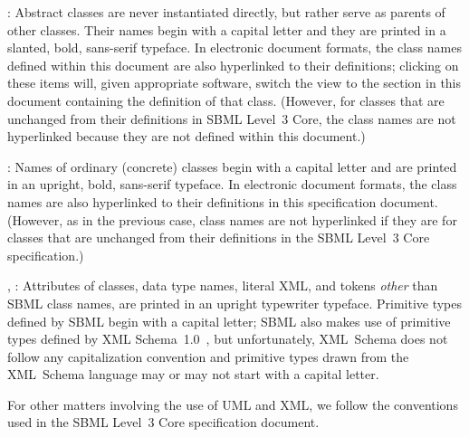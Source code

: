 \begin{description}
  
\item {}: Abstract classes are never
  instantiated directly, but rather serve as parents of other classes.
  Their names begin with a capital letter and they are printed in a
  slanted, bold, sans-serif typeface.  In electronic document formats,
  the class names defined within this document are also hyperlinked to
  their definitions; clicking on these items will, given appropriate
  software, switch the view to the section in this document containing
  the definition of that class.  (However, for classes that are
  unchanged from their definitions in SBML Level~3 Core, the class names
  are not hyperlinked because they are not defined within this
  document.)
  
\item {}: Names of ordinary (concrete) classes begin with a
  capital letter and are printed in an upright, bold, sans-serif
  typeface.  In electronic document formats, the class names are also
  hyperlinked to their definitions in this specification document.
  (However, as in the previous case, class names are not hyperlinked if
  they are for classes that are unchanged from their definitions in the
  SBML Level~3 Core specification.)

\item {}, : Attributes of classes, data
  type names, literal XML, and tokens \emph{other} than SBML class
  names, are printed in an upright typewriter typeface.  Primitive types
  defined by SBML begin with a capital letter; SBML also makes use of
  primitive types defined by XML
  Schema~1.0~\citep{biron:2000,fallside:2000,thompson:2000}, but
  unfortunately, XML~Schema does not follow any capitalization
  convention and primitive types drawn from the XML~Schema language may
  or may not start with a capital letter.

\end{description}

For other matters involving the use of UML and XML, we follow the
conventions used in the SBML Level~3 Core specification document.  




